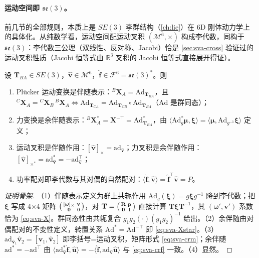 \paragraph{运动空间即 $\mathfrak{se}(3)$。}
前几节的全部规则，本质上是 $SE(3)$ 李群结构（\cref{ch:lie}）在 6D 刚体动力学上的具体化。从纯数学看，运动空间配运动叉积 $(\mathcal M^6,\times)$ 构成李代数，同构于 $\mathfrak{se}(3)$：李代数三公理（双线性、反对称、Jacobi）恰是 \cref{sec:sva-cross} 验证过的运动叉积性质（Jacobi 恒等式由 $\mathbb R^3$ 叉积的 Jacobi 恒等式直接展开得证）。

\begin{theorem}\label{thm:sva-lie}
设 $\mathbf T_{BA}\in SE(3)$，$\hat{\mathbf v}\in\mathcal M^6$，$\hat{\mathbf f}\in\mathcal F^6=\mathfrak{se}(3)^*$。则
\begin{enumerate}
  \item Plücker 运动变换是伴随表示：${}^B\mathbf X_A=\mathrm{Ad}_{\mathbf T_{BA}}$，且 ${}^C\mathbf X_A={}^C\mathbf X_B\,{}^B\mathbf X_A\iff\mathrm{Ad}_{\mathbf T_{CA}}=\mathrm{Ad}_{\mathbf T_{CB}}\!\circ\mathrm{Ad}_{\mathbf T_{BA}}$（$\mathrm{Ad}$ 是群同态）；
  \item 力变换是余伴随表示：${}^B\mathbf X_A^*=\mathbf X^{-\top}=\mathrm{Ad}^*_{\mathbf T_{BA}}$，由 $\langle\mathrm{Ad}^*_g\boldsymbol\mu,\boldsymbol\xi\rangle=\langle\boldsymbol\mu,\mathrm{Ad}_{g^{-1}}\boldsymbol\xi\rangle$ 定义；
  \item 运动叉积是伴随作用：$[\hat{\mathbf v}]_\times=\mathrm{ad}_{\hat{\mathbf v}}$；力叉积是余伴随作用：$[\hat{\mathbf v}]_{\times^*}=\mathrm{ad}^*_{\hat{\mathbf v}}=-\mathrm{ad}_{\hat{\mathbf v}}^\top$；
  \item 功率配对即李代数与其对偶的自然配对：$\langle\hat{\mathbf f},\hat{\mathbf v}\rangle=\hat{\mathbf f}^\top\hat{\mathbf v}=P$。
\end{enumerate}
\end{theorem}

\begin{proof}[证明骨架]
（1）伴随表示定义为群上共轭作用 $\mathrm{Ad}_g(\boldsymbol\xi)=g\boldsymbol\xi g^{-1}$ 降到李代数；把 $\boldsymbol\xi$ 写成 4×4 矩阵 $\begin{psmallmatrix}[\boldsymbol\omega]_\times&\mathbf v\\ \mathbf 0&0\end{psmallmatrix}$，对 $\mathbf T=\begin{psmallmatrix}\mathbf R&\mathbf p\\ \mathbf 0&1\end{psmallmatrix}$ 直接计算 $\mathbf T\boldsymbol\xi\mathbf T^{-1}$，其 $(\boldsymbol\omega',\mathbf v')$ 系数恰为 \cref{eq:sva-X}。群同态性由共轭复合 $g_1g_2(\cdot)(g_1g_2)^{-1}$ 给出。（2）余伴随由对偶配对的不变性定义，转置关系 $\mathrm{Ad}^*=\mathrm{Ad}^{-\top}$ 即 \cref{eq:sva-Xstar}。（3）$\mathrm{ad}_{\hat{\mathbf v}_1}\hat{\mathbf v}_2=[\hat{\mathbf v}_1,\hat{\mathbf v}_2]$ 即李括号=运动叉积，矩阵形式 \cref{eq:sva-crm}；余伴随 $\mathrm{ad}^*=-\mathrm{ad}^\top$ 由 $\langle\mathrm{ad}^*_{\hat{\mathbf v}}\hat{\mathbf f},\hat{\mathbf u}\rangle=-\langle\hat{\mathbf f},\mathrm{ad}_{\hat{\mathbf v}}\hat{\mathbf u}\rangle$ 与 \cref{eq:sva-crf} 一致。（4）显然。
\end{proof}

